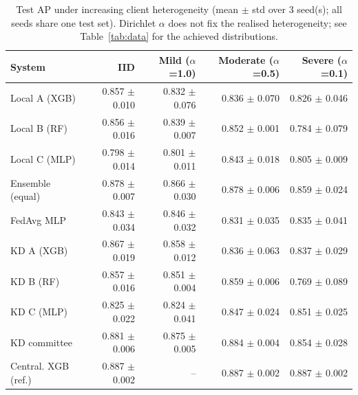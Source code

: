 \begin{table}[t]
\centering
\scriptsize
\caption{Test AP under increasing client heterogeneity (mean $\pm$ std over 3 seed(s); all seeds share one test set). Dirichlet $\alpha$ does not fix the realised heterogeneity; see Table~\ref{tab:data} for the achieved distributions.}
\label{tab:noniid}
\begin{tabular}{lrrrr}
\toprule
System & IID & Mild ($\alpha$=1.0) & Moderate ($\alpha$=0.5) & Severe ($\alpha$=0.1) \\
\midrule
Local A (XGB) & 0.857 $\pm$ 0.010 & 0.832 $\pm$ 0.076 & 0.836 $\pm$ 0.070 & 0.826 $\pm$ 0.046 \\
Local B (RF) & 0.856 $\pm$ 0.016 & 0.839 $\pm$ 0.007 & 0.852 $\pm$ 0.001 & 0.784 $\pm$ 0.079 \\
Local C (MLP) & 0.798 $\pm$ 0.014 & 0.801 $\pm$ 0.011 & 0.843 $\pm$ 0.018 & 0.805 $\pm$ 0.009 \\
Ensemble (equal) & 0.878 $\pm$ 0.007 & 0.866 $\pm$ 0.030 & 0.878 $\pm$ 0.006 & 0.859 $\pm$ 0.024 \\
FedAvg MLP & 0.843 $\pm$ 0.034 & 0.846 $\pm$ 0.032 & 0.831 $\pm$ 0.035 & 0.835 $\pm$ 0.041 \\
KD A (XGB) & 0.867 $\pm$ 0.019 & 0.858 $\pm$ 0.012 & 0.836 $\pm$ 0.063 & 0.837 $\pm$ 0.029 \\
KD B (RF) & 0.857 $\pm$ 0.016 & 0.851 $\pm$ 0.004 & 0.859 $\pm$ 0.006 & 0.769 $\pm$ 0.089 \\
KD C (MLP) & 0.825 $\pm$ 0.022 & 0.824 $\pm$ 0.041 & 0.847 $\pm$ 0.024 & 0.851 $\pm$ 0.025 \\
KD committee & 0.881 $\pm$ 0.006 & 0.875 $\pm$ 0.005 & 0.884 $\pm$ 0.004 & 0.854 $\pm$ 0.028 \\
Central. XGB (ref.) & 0.887 $\pm$ 0.002 & -- & 0.887 $\pm$ 0.002 & 0.887 $\pm$ 0.002 \\
\bottomrule
\end{tabular}
\end{table}
